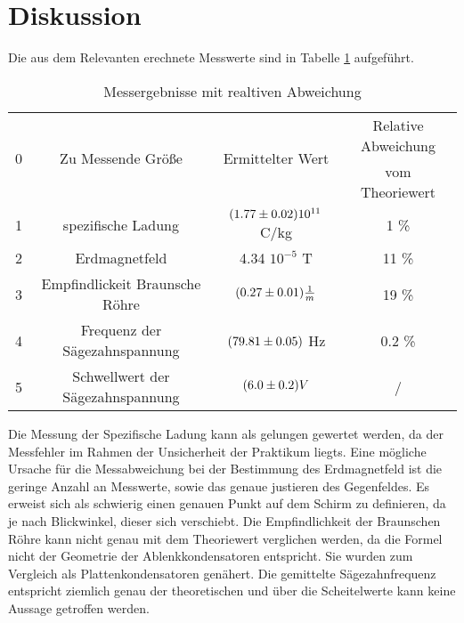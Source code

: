 \section{Diskussion}
\label{sec:Diskussion}
Die aus dem Relevanten erechnete Messwerte sind in Tabelle \ref{tab:sum} aufgeführt.
\begin{table}
  \centering
  \begin{tabular}{c| c c c}
    \toprule
	\multirow{2}{*}{0} & \multirow{2}{*}{Zu Messende Größe} & \multirow{2}{*}{Ermittelter Wert} & Relative Abweichung \\
	& & & vom Theoriewert \\
    \midrule
    1& spezifische Ladung & $(\num{1.77 +- 0.02})10^{11}$ C/kg & 1 \%	\\
    2& Erdmagnetfeld 	  &  4.34 \cdot $10^{-5}$ T       & 11 \% 	\\
    3& Empfindlickeit Braunsche Röhre& $(\num{0.27 +- 0.01}) \frac{1}{m}$ & 19 \% \\
    4& Frequenz der Sägezahnspannung& $(\num{79.81 +- 0.05})$ Hz & 0.2 \% \\
    5& Schwellwert der Sägezahnspannung& $ (\num{6.0 +- 0.2}) V $& / \\
    \bottomrule
  \end{tabular}
  \caption{Messergebnisse mit realtiven Abweichung}
  \label{tab:sum}
\end{table}
Die Messung der Spezifische Ladung kann als gelungen gewertet werden, da der Messfehler im Rahmen der Unsicherheit der Praktikum liegts. Eine mögliche Ursache für die Messabweichung bei der Bestimmung des Erdmagnetfeld ist die geringe Anzahl an Messwerte, sowie das genaue justieren des Gegenfeldes. Es erweist sich als schwierig einen genauen Punkt auf dem Schirm zu definieren, da je nach Blickwinkel, dieser sich verschiebt. Die Empfindlichkeit der Braunschen Röhre kann nicht genau mit dem Theoriewert verglichen werden, da die Formel nicht der Geometrie der Ablenkkondensatoren entspricht. Sie wurden zum Vergleich als Plattenkondensatoren genähert. Die gemittelte Sägezahnfrequenz entspricht ziemlich genau der theoretischen und über die Scheitelwerte kann keine Aussage getroffen werden. 
